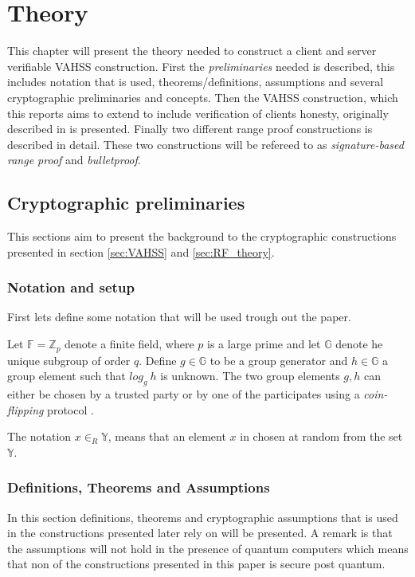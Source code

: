 \chapter{Theory}
This chapter will present the theory needed to construct a client and server verifiable VAHSS construction.  First the \textit{preliminaries} needed is described, this includes notation that is used, theorems/definitions, assumptions and several cryptographic preliminaries and  concepts. Then the VAHSS construction, which this reports aims to extend to include verification of clients honesty, originally described in \cite{SumItUp} \cite{VAHSS}  is presented.  Finally two different range proof constructions is described in detail. These two constructions will be refereed to as \textit{signature-based range proof} and \textit{bulletproof}. 


\section{Cryptographic preliminaries}
This sections aim to present the background to the cryptographic constructions presented in section \ref{sec:VAHSS} and \ref{sec:RF_theory}. 
\subsection*{Notation and setup}
First lets define some notation that will be used trough out the paper.



Let $\mathds{F}=\mathds{Z}_p$ denote a finite field, where $p$ is a large prime and let $\mathds{G}$ denote he unique subgroup of order $q$.  Define $g\in\mathds{G}$ to be a group generator and $h\in\mathds{G}$ a group element such that  $log_g\:h$ is unknown. The two group elements $g,h$ can either be chosen by a trusted party or by one of the participates using a \textit{coin-flipping} protocol \cite{pedersen}.

The notation $x\in_R\mathds{Y}$, means that an element $x$ in chosen at random from the set $\mathds{Y}$.

\subsection*{Definitions, Theorems and Assumptions}
In this section definitions, theorems  and cryptographic assumptions that is used in the constructions presented later rely on will be presented. A remark is that the assumptions will not hold in the presence of quantum computers which means that non of the constructions presented in this paper is secure post quantum.

